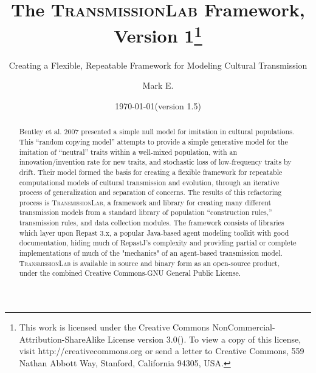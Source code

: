 \documentclass[noid]{kluwer-mem-proposal}
\newcommand{\tlfull}{\textsc{TransmissionLab}\xspace}
\begin{document}
\begin{article}
\begin{opening}
\title{The \tlfull Framework, Version 1\thanks{This work is licensed under the Creative Commons NonCommercial-Attribution-ShareAlike License version 3.0(\byncsa). 
To view a copy of this license, visit http://creativecommons.org or send a letter to 
Creative Commons, 559 Nathan Abbott Way, Stanford, California 94305, USA.}}
\subtitle{Creating a Flexible, Repeatable Framework for Modeling Cultural Transmission}

\runningtitle{The \tlfull Framework}

\author{Mark E. }  


\date{\today (version 1.5)}

\begin{abstract}
Bentley et al. 2007 presented a simple null model for imitation in cultural populations.  
This ``random copying model'' attempts to provide a simple generative model for the imitation of 
``neutral'' traits within a well-mixed population, with an innovation/invention rate for 
new traits, and stochastic loss of low-frequency traits by drift.  Their model formed the basis for creating a flexible framework
for repeatable computational models of cultural transmission and evolution, through an iterative process of 
generalization and separation of concerns. 
The results of this refactoring process is \tlfull, a framework and library for creating many different transmission models from a standard library of population ``construction rules,'' transmission rules, and data collection 
modules.  
The framework consists of libraries which layer upon Repast 3.x, a popular Java-based agent modeling toolkit with good 
documentation, hiding much of RepastJ's complexity and providing partial or complete implementations of much of the "mechanics" of an agent-based transmission model.  \tlfull is available in source and binary form as an open-source product, under the combined Creative Commons-GNU General Public License.  
\end{abstract}


\end{opening}


\end{article}
\end{document}
